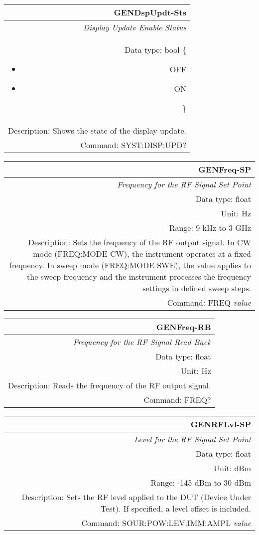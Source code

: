 \documentclass[openany]{article}
\begin{document}
		\begin{tabular}{N}
			\hline
			\bfseries GENDspUpdt-Sts \\ \hline
			\emph{Display Update Enable Status} \\
			Data type: bool \{\begin{itemize}[noitemsep]
				\small
				\item[] OFF
				\item[] ON
			\end{itemize}\} \\
			Description: Shows the state of the display update. \\
			Command: SYST:DISP:UPD? \\

		\end{tabular}
%
		\begin{tabular}{N}
			\hline
			\bfseries GENFreq-SP \\ \hline
			\emph{Frequency for the RF Signal Set Point} \\
			Data type: float \\
			Unit: Hz \\
			Range: 9 kHz to 3 GHz \\
			Description: Sets the frequency of the RF output signal. In CW mode (FREQ:MODE CW), the instrument operates at a fixed frequency. In sweep mode (FREQ:MODE SWE), the value applies to the sweep frequency and the instrument processes the frequency settings in defined sweep steps.\\
			Command: FREQ \emph{value} \\
			
		\end{tabular}


		\begin{tabular}{N}
			\hline
			\bfseries GENFreq-RB \\ \hline
			\emph{Frequency for the RF Signal Read Back} \\
			Data type: float \\
			Unit: Hz \\
			Description: Reads the frequency of the RF output signal. \\
			Command: FREQ? \\

		\end{tabular}
%
		\begin{tabular}{N}
			\hline
			\bfseries GENRFLvl-SP \\ \hline
			\emph{Level for the RF Signal Set Point} \\
			Data type: float \\
			Unit: dBm \\
			Range: -145 dBm to 30 dBm \\
			Description: Sets the RF level applied to the DUT (Device Under Test). If specified, a level offset is included. \\
			Command: SOUR:POW:LEV:IMM:AMPL \emph{value} \\
			
		\end{tabular}
\end{document}
